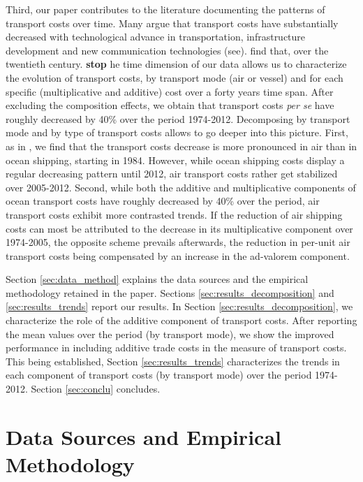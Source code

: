 \documentclass[a4paper,11pt]{article}
\begin{document}
Third, our paper contributes to the literature documenting the patterns of transport costs over time. Many argue that transport costs have substantially decreased with technological advance in transportation, infrastructure development and new communication technologies (see\citealp{Lafourcade_Thisse}). \cite{Glaeser04} find that, over the twentieth century. \textbf{stop} he time dimension of our data allows us to characterize the evolution of transport costs, by transport mode (air or vessel) and for each specific (multiplicative and additive) cost over a forty years time span. After excluding the composition effects, we obtain that transport costs \textit{per se} have roughly decreased by 40\% over the period 1974-2012. Decomposing by transport mode and by type of transport costs allows to go deeper into this picture. First, as in \cite{hummels2007}, we find that the transport costs decrease is more pronounced in air than in ocean shipping, starting in 1984. However, while ocean shipping costs display a regular decreasing pattern until 2012, air transport costs rather get stabilized over 2005-2012. Second, while both the additive and multiplicative components of ocean transport costs have roughly decreased by 40\% over the period, air transport costs exhibit more contrasted trends. If the reduction of air shipping costs can most be attributed to the decrease in its multiplicative component over 1974-2005, the opposite scheme prevails afterwards, the reduction in per-unit air transport costs being compensated by an increase in the ad-valorem component. \smallskip


Section \ref{sec:data_method} explains the data sources and the empirical methodology retained in the paper. Sections \ref{sec:results_decomposition} and \ref{sec:results_trends} report our results. In Section \ref{sec:results_decomposition}, we characterize the role of the additive component of transport costs. After reporting the mean values over the period (by transport mode), we show the improved performance in including additive trade costs in the measure of transport costs. This being established, Section \ref{sec:results_trends} characterizes the trends in each component of transport costs (by transport mode) over the period 1974-2012. Section \ref{sec:conclu} concludes.



\section{Data Sources and Empirical Methodology \label{sec:data_method}}
\end{document}
